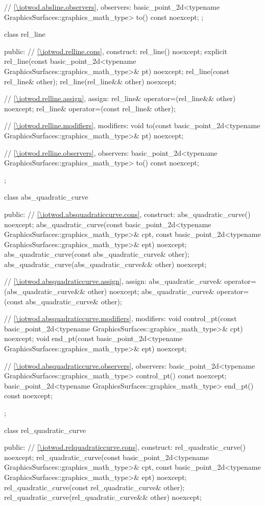 \begin{codeblock}
{{{      // \ref{\iotwod.absline.observers}, observers:
      basic_point_2d<typename GraphicsSurfaces::graphics_math_type> to() const noexcept;
    };

    class rel_line {
    public:
      // \ref{\iotwod.relline.cons}, construct:
      rel_line() noexcept;
      explicit rel_line(const basic_point_2d<typename
        GraphicsSurfaces::graphics_math_type>& pt) noexcept;
      rel_line(const rel_line& other);
      rel_line(rel_line&& other) noexcept;

      // \ref{\iotwod.relline.assign}, assign:
      rel_line& operator=(rel_line&& other) noexcept;
      rel_line& operator=(const rel_line& other);

      // \ref{\iotwod.relline.modifiers}, modifiers:
      void to(const basic_point_2d<typename GraphicsSurfaces::graphics_math_type>& pt) noexcept;

      // \ref{\iotwod.relline.observers}, observers:
      basic_point_2d<typename GraphicsSurfaces::graphics_math_type> to() const noexcept;
    };

    class abs_quadratic_curve {
    public:
      // \ref{\iotwod.absquadraticcurve.cons}, construct:
      abs_quadratic_curve() noexcept;
      abs_quadratic_curve(const basic_point_2d<typename
        GraphicsSurfaces::graphics_math_type>& cpt, const basic_point_2d<typename
        GraphicsSurfaces::graphics_math_type>& ept) noexcept;
      abs_quadratic_curve(const abs_quadratic_curve& other);
      abs_quadratic_curve(abs_quadratic_curve&& other) noexcept;

      // \ref{\iotwod.absquadraticcurve.assign}, assign:
      abs_quadratic_curve& operator=(abs_quadratic_curve&& other) noexcept;
      abs_quadratic_curve& operator=(const abs_quadratic_curve& other);

      // \ref{\iotwod.absquadraticcurve.modifiers}, modifiers:
      void control_pt(const basic_point_2d<typename
        GraphicsSurfaces::graphics_math_type>& cpt) noexcept;
      void end_pt(const basic_point_2d<typename
        GraphicsSurfaces::graphics_math_type>& ept) noexcept;

      // \ref{\iotwod.absquadraticcurve.observers}, observers:
      basic_point_2d<typename GraphicsSurfaces::graphics_math_type> control_pt() const noexcept;
      basic_point_2d<typename GraphicsSurfaces::graphics_math_type> end_pt() const noexcept;
    };

    class rel_quadratic_curve {
    public:
      // \ref{\iotwod.relquadraticcurve.cons}, construct:
      rel_quadratic_curve() noexcept;
      rel_quadratic_curve(const basic_point_2d<typename
        GraphicsSurfaces::graphics_math_type>& cpt, const basic_point_2d<typename
        GraphicsSurfaces::graphics_math_type>& ept) noexcept;
      rel_quadratic_curve(const rel_quadratic_curve& other);
      rel_quadratic_curve(rel_quadratic_curve&& other) noexcept;

}}}
\end{codeblock}
